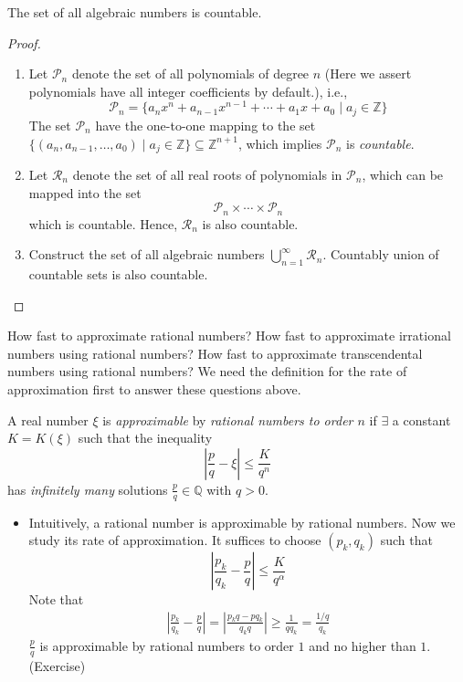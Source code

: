 \begin{proposition}
The set of all algebraic numbers is countable.
\end{proposition}
\begin{proof}
\begin{enumerate}
\item
Let $\mathcal{P}_n$ denote the set of all polynomials of degree $n$ (Here we assert polynomials have all integer coefficients by default.), i.e., 
\[
\mathcal{P}_n=\{a_nx^n+a_{n-1}x^{n-1}+\cdots+a_1x+a_0\mid a_j\in\mathbb{Z}\}
\]
The set $\mathcal{P}_n$ have the one-to-one mapping to the set $\{(a_n,a_{n-1},\dots,a_0)\mid a_j\in\mathbb{Z}\}\subseteq\mathbb{Z}^{n+1}$, which implies $\mathcal{P}_n$ is \emph{countable}.
\item
Let $\mathcal{R}_n$ denote the set of all real roots of polynomials in $\mathcal{P}_n$, which can be mapped into the set 
\[
\mathcal{P}_n\times\cdots\times\mathcal{P}_n
\]
which is countable. Hence, $\mathcal{R}_n$ is also countable.
\item
Construct the set of all algebraic numbers $\bigcup_{n=1}^\infty\mathcal{R}_n$. Countably union of countable sets is also countable.
\end{enumerate}
\end{proof}

How fast to approximate rational numbers? How fast to approximate irrational numbers using rational numbers? How fast to approximate transcendental numbers using rational numbers? We need the definition for the rate of approximation first to answer these questions above.

\begin{definition}
A real number $\xi$ is \emph{approximable} by \emph{rational numbers to order $n$} if $\exists$ a constant $K = K(\xi)$ such that the inequality
\[
\left|\frac{p}{q} - \xi\right|\le\frac{K}{q^n}
\]
has \emph{infinitely many} solutions $\frac{p}{q}\in\mathbb{Q}$ with $q>0$.
\end{definition}

\begin{example}
\begin{itemize}
\item
Intuitively, a rational number is approximable by rational numbers. Now we study its rate of approximation. It suffices to choose $(p_k,q_k)$ such that
\[
\left|
\frac{p_k}{q_k}-\frac{p}{q}
\right|\le\frac{K}{q^\alpha}
\]
Note that
\begin{align*}
\left|
\frac{p_k}{q_k}-\frac{p}{q}
\right|=\left|
\frac{p_kq-pq_k}{q_kq}
\right|\ge\frac{1}{qq_k}=\frac{1/q}{q_k}
\end{align*}
$\frac{p}{q}$ is approximable by rational numbers to order $1$ and no higher than $1$. (Exercise)
\end{itemize}
\end{example}


